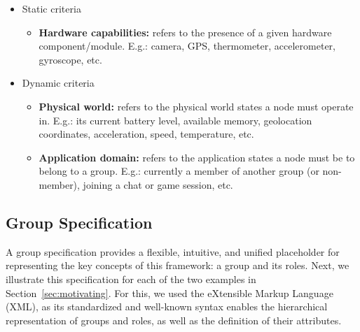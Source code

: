 \begin{itemize}
	
	\item Static criteria
	
	\begin{itemize}
		\item \textbf{Hardware capabilities:} refers to the presence of a given hardware component/module. E.g.: camera, GPS, thermometer, accelerometer, gyroscope, etc.
	\end{itemize}
	
	\item Dynamic criteria
	
	\begin{itemize}
		\item \textbf{Physical world:} refers to the physical world states a node must operate in. E.g.: its current battery level, available memory, geolocation coordinates, acceleration, speed, temperature, etc.
		
		\item \textbf{Application domain:} refers to the application states a node must be to belong to a group. E.g.: currently a member of another group (or non-member), joining a chat or game session, etc.
	\end{itemize}
\end{itemize}

\subsection{Group Specification}


A group specification provides a flexible, intuitive, and unified placeholder for representing the key concepts of this framework: a group and its roles. Next, we illustrate this specification for each of the two examples in Section~\ref{sec:motivating}. For this, we used the eXtensible Markup Language (XML), as its standardized and well-known syntax enables the hierarchical representation of groups and roles, as well as the definition of their attributes.


